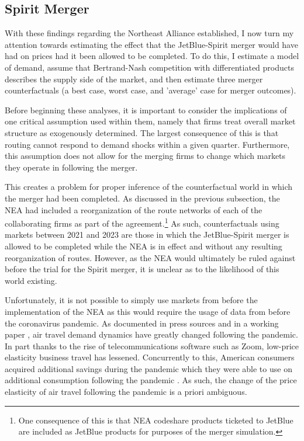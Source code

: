 \documentclass{article}
\begin{document}
	
	\subsection{Spirit Merger}
	With these findings regarding the Northeast Alliance established, I now turn my attention towards estimating the effect that the JetBlue-Spirit merger would have had on prices had it been allowed to be completed. To do this, I estimate a model of demand, assume that Bertrand-Nash competition with differentiated products describes the supply side of the market, and then estimate three merger counterfactuals (a best case, worst case, and 'average' case for merger outcomes). 
	
	Before beginning these analyses, it is important to consider the implications of one critical assumption used within them, namely that firms treat overall market structure as exogenously determined. The largest consequence of this is that routing cannot respond to demand shocks within a given quarter. Furthermore, this assumption does not allow for the merging firms to change which markets they operate in following the merger.
	
	This creates a problem for proper inference of the counterfactual world in which the merger had been completed. As discussed in the previous subsection, the NEA had included a reorganization of the route networks of each of the collaborating firms as part of the agreement.\footnote{One consequence of this is that NEA codeshare products ticketed to JetBlue are included as JetBlue products for purposes of the merger simulation.} As such, counterfactuals using markets between 2021 and 2023 are those in which the JetBlue-Spirit merger is allowed to be completed while the NEA is in effect and without any resulting reorganization of routes. However, as the NEA would ultimately be ruled against before the trial for the Spirit merger, it is unclear as to the likelihood of this world existing.
	
	Unfortunately, it is not possible to simply use markets from before the implementation of the NEA as this would require the usage of data from before the coronavirus pandemic. As documented in press sources and in a working paper \citep{ewen_zoom_2023}, air travel demand dynamics have greatly changed following the pandemic. In part thanks to the rise of telecommunications software such as Zoom, low-price elasticity business travel has lessened. Concurrently to this, American consumers acquired additional savings during the pandemic which they were able to use on additional consumption following the pandemic \citep{klitgaard_spending_2023}. As such, the change of the price elasticity of air travel following the pandemic is a priori ambiguous.  
	
\end{document}
